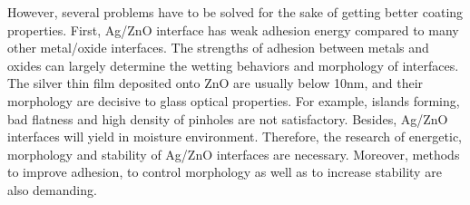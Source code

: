 However, several problems have to be solved for the sake of getting better coating properties. First, Ag/ZnO interface has weak adhesion energy compared to many other metal/oxide interfaces. The strengths of adhesion between metals and oxides can largely determine the wetting behaviors and morphology of interfaces. The silver thin film deposited onto ZnO are usually below 10nm, and their morphology are decisive to glass optical properties. For example, islands forming, bad flatness and high density of pinholes are not satisfactory. Besides, Ag/ZnO interfaces will yield in moisture environment. Therefore, the research of energetic, morphology and stability of Ag/ZnO interfaces are necessary. Moreover, methods to improve adhesion, to control morphology as well as to increase stability are also demanding.
 